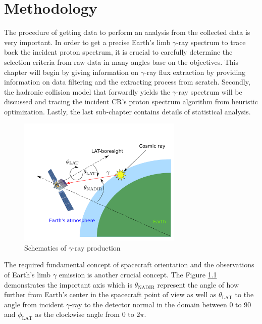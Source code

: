\chapter{Methodology}

The procedure of getting data to perform an analysis
from the collected data is very important. In order 
to get a precise Earth's limb $\gamma$-ray spectrum to
trace back the incident proton spectrum, it is crucial 
to carefully determine the selection criteria from raw 
data in many angles base on the objectives. This chapter 
will begin by giving information on $\gamma$-ray flux extraction 
by providing information on data filtering and 
the extracting process from scratch. Secondly, the hadronic collision 
model that forwardly yields the $\gamma$-ray spectrum 
will be discussed and tracing the incident CR's proton 
spectrum algorithm from heuristic optimization. Lastly,
the last sub-chapter contains details of statistical analysis.

\begin{figure}[h!]
    \centering
    \includegraphics[width=0.7\textwidth]{content/methodology/figures/gamma_production_schematic}
    \caption{Schematics of $\gamma$-ray production}
    \label{fig:gamma_emis_sp}
\end{figure}

The required fundamental concept of spacecraft orientation and 
the observations of Earth's limb $\gamma$ emission is another crucial
concept. The Figure \ref{fig:gamma_emis_sp} demonstrates the important
axis which is $\theta_\text{NADIR}$ represent the angle of how further
from Earth's center in the spacecraft point of view as well as 
$\theta_\text{LAT}$ to the angle from incident $\gamma$-ray to the 
detector normal in the domain between 0 to 90\textdegree
and $\phi_\text{LAT}$ as the clockwise angle from 0 to 2$\pi$.



